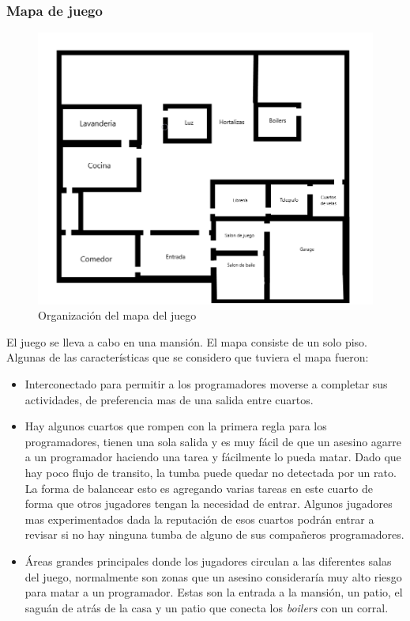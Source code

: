 \subsubsection{Mapa de juego}
\begin{figure}[h]
    \centering
    \includegraphics[width=1\linewidth]{images/MapaJuego.png}
    \caption{Organización del mapa del juego}
    \label{fig:mapa_juego}
\end{figure}
El juego se lleva a cabo en una mansión. El mapa consiste de un solo piso. Algunas de las características que se considero que tuviera el mapa fueron:
\begin{itemize}
    \item Interconectado para permitir a los programadores moverse a completar sus actividades, de preferencia mas de una salida entre cuartos. 
    \item Hay algunos cuartos que rompen con la primera regla para los programadores, tienen una sola salida y es muy fácil de que un asesino agarre a un programador haciendo una tarea y fácilmente lo pueda matar. Dado que hay poco flujo de transito, la tumba puede quedar no detectada por un rato. La forma de balancear esto es agregando varias tareas en este cuarto de forma que otros jugadores tengan la necesidad de entrar. Algunos jugadores mas experimentados dada la reputación de esos cuartos podrán entrar a revisar si no hay ninguna tumba de alguno de sus compañeros programadores.
    \item Áreas grandes principales donde los jugadores circulan a las diferentes salas del juego, normalmente son zonas que un asesino consideraría muy alto riesgo para matar a un programador. Estas son la entrada a la mansión, un patio, el saguán de atrás de la casa y un patio que conecta los \textit{boilers} con un corral.
\end{itemize}

